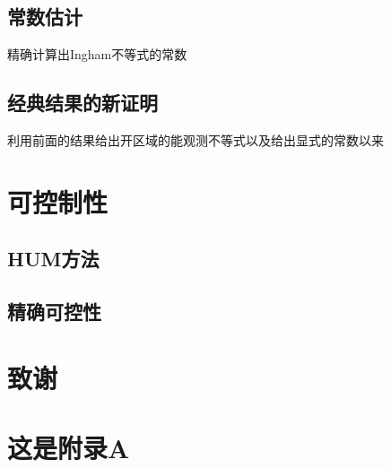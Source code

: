 \documentclass[master]{cugthesis}
\begin{document}
   \fi 
{   \color{red}
\section{常数估计}
精确计算出Ingham不等式的常数
\section{经典结果的新证明}
利用前面的结果给出开区域的能观测不等式以及给出显式的常数以来
\chapter{可控制性}
\section{HUM方法}
\section{精确可控性}
 }    
 \fi 

    
    
    
    
    
    

    \backmatter
    \chapter{致谢}

    \appendix
    \chapter{这是附录A}
\end{document}
